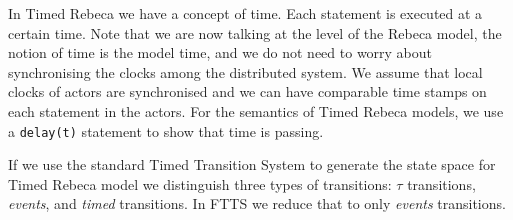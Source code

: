 In Timed Rebeca we have a concept of time. Each statement is executed at a certain time. Note that we are now talking at the level of the Rebeca model, the notion of time is the model time, and we do not need to worry about synchronising the clocks among the distributed system. We assume that local clocks of actors are synchronised and we can have comparable time stamps on each statement in the actors.
%
For the semantics of Timed Rebeca models, we use a \texttt{delay(t)} statement to show that time is passing. 

If we use the standard Timed Transition System to generate the state space for Timed Rebeca model we distinguish three types of transitions: $\tau$ transitions, \textit{events}, and \textit{timed} transitions.
In FTTS we reduce that to only \textit{events} transitions.
%





